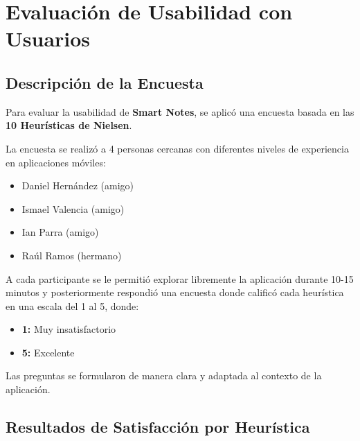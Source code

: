 \documentclass[12pt,a4paper]{article}
\begin{document}
\section{Evaluación de Usabilidad con Usuarios}

\subsection{Descripción de la Encuesta}

Para evaluar la usabilidad de \textbf{Smart Notes}, se aplicó una encuesta basada en las \textbf{10 Heurísticas de Nielsen}. 

La encuesta se realizó a 4 personas cercanas con diferentes niveles de experiencia en aplicaciones móviles:
\begin{itemize}
    \item Daniel Hernández (amigo)
    \item Ismael Valencia (amigo)
    \item Ian Parra (amigo)
    \item Raúl Ramos (hermano)
\end{itemize}

A cada participante se le permitió explorar libremente la aplicación durante 10-15 minutos y posteriormente respondió una encuesta donde calificó cada heurística en una escala del 1 al 5, donde:
\begin{itemize}
    \item \textbf{1:} Muy insatisfactorio
    \item \textbf{5:} Excelente
\end{itemize}

Las preguntas se formularon de manera clara y adaptada al contexto de la aplicación.

\subsection{Resultados de Satisfacción por Heurística}
\end{document}
